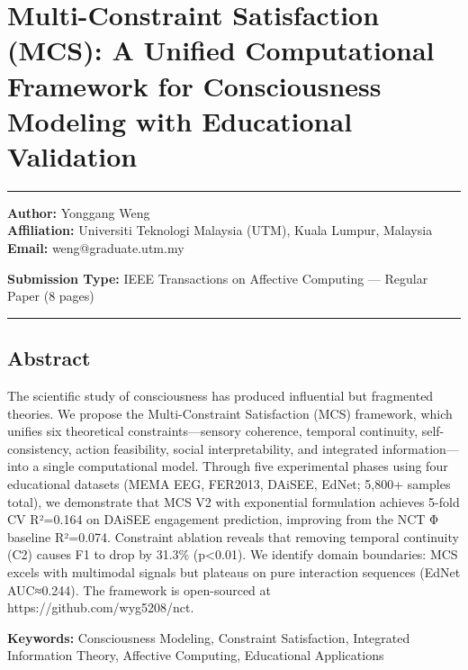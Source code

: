 \documentclass[
]{article}
\author{}
\date{}
\begin{document}
\section{Multi-Constraint Satisfaction (MCS): A Unified Computational
Framework for Consciousness Modeling with Educational
Validation}\label{multi-constraint-satisfaction-mcs-a-unified-computational-framework-for-consciousness-modeling-with-educational-validation}

\begin{center}\rule{0.5\linewidth}{0.5pt}\end{center}

\textbf{Author:} Yonggang Weng\\
\textbf{Affiliation:} Universiti Teknologi Malaysia (UTM), Kuala Lumpur,
Malaysia\\
\textbf{Email:} weng@graduate.utm.my

\textbf{Submission Type:} IEEE Transactions on Affective Computing ---
Regular Paper (8 pages)

\begin{center}\rule{0.5\linewidth}{0.5pt}\end{center}

\subsection{Abstract}\label{abstract}

The scientific study of consciousness has produced influential but
fragmented theories. We propose the Multi-Constraint Satisfaction (MCS)
framework, which unifies six theoretical constraints---sensory
coherence, temporal continuity, self-consistency, action feasibility,
social interpretability, and integrated information---into a single
computational model. Through five experimental phases using four
educational datasets (MEMA EEG, FER2013, DAiSEE, EdNet; 5,800+ samples
total), we demonstrate that MCS V2 with exponential formulation achieves
5-fold CV R²=0.164 on DAiSEE engagement prediction, improving from the
NCT Φ baseline R²=0.074. Constraint ablation reveals that removing
temporal continuity (C2) causes F1 to drop by 31.3\% (p\textless0.01).
We identify domain boundaries: MCS excels with multimodal signals but
plateaus on pure interaction sequences (EdNet AUC≈0.244). The framework
is open-sourced at https://github.com/wyg5208/nct.

\textbf{Keywords:} Consciousness Modeling, Constraint Satisfaction,
Integrated Information Theory, Affective Computing, Educational
Applications
\end{document}
